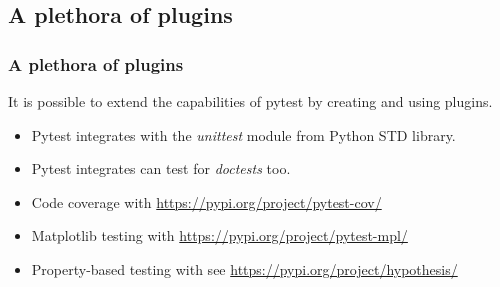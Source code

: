 \documentclass[t]{beamer}
\begin{document}
\subsection{A plethora of plugins}
\begin{frame}[fragile=singleslide]
  \frametitle{A plethora of plugins}

   It is possible to extend the capabilities of pytest by creating and using plugins.

   \vspace{1em}

   \begin{itemize}
       \item Pytest integrates with the \textit{unittest} module from Python STD library.
       \item Pytest integrates can test for \textit{doctests} too.
       \item Code coverage with \href{https://pypi.org/project/pytest-cov/}{https://pypi.org/project/pytest-cov/}
       \item Matplotlib testing with \href{https://pypi.org/project/pytest-mpl/}{https://pypi.org/project/pytest-mpl/}
       \item Property-based testing with see \href{https://pypi.org/project/hypothesis/}{https://pypi.org/project/hypothesis/}
   \end{itemize}

   \vspace{1em}


\end{frame}

\end{document}
